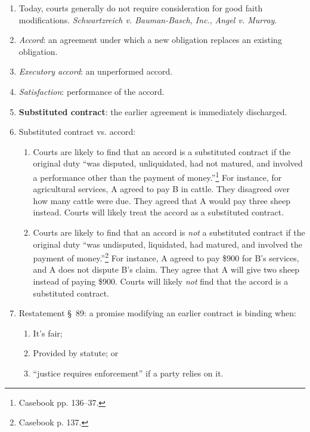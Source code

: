 \begin{enumerate}
    \item Today, courts generally do not require consideration for good faith 
    modifications. \emph{Schwartzreich v. Bauman-Basch, Inc.}, \emph{Angel v. 
    Murray}.
    \item \emph{Accord}: an agreement under which a new obligation replaces an 
    existing obligation.
    \item \emph{Executory accord}: an unperformed accord.
    \item \emph{Satisfaction}: performance of the accord.
    \item \textbf{Substituted contract}: the earlier agreement is immediately 
    discharged.
    \item Substituted contract vs. accord:
    \begin{enumerate}
        \item Courts are likely to find that an accord is a substituted 
        contract if the original duty ``was disputed, unliquidated, had not 
        matured, and involved a performance other than the payment of 
        money.''\footnote{Casebook pp. 136--37.} For instance, for 
        agricultural services, A agreed to pay B in cattle. They disagreed 
        over how many cattle were due. They agreed that A would pay three 
        sheep instead. Courts will likely treat the accord as a substituted 
        contract.
        \item Courts are likely to find that an accord is \emph{not} a 
        substituted contract if the original duty ``was undisputed, 
        liquidated, had matured, and involved the payment of 
        money.''\footnote{Casebook p. 137.} For instance, A agreed to pay 
        \$900 for B's services, and A does not dispute B's claim. They agree 
        that A will give two sheep instead of paying \$900.  Courts will 
        likely \emph{not} find that the accord is a substituted contract.
    \end{enumerate}
    \item Restatement \S\ 89: a promise modifying an earlier contract is 
    binding when:
    \begin{enumerate}
        \item It's fair;
        \item Provided by statute; or
        \item ``justice requires enforcement'' if a party relies on it.
    \end{enumerate}
\end{enumerate}

